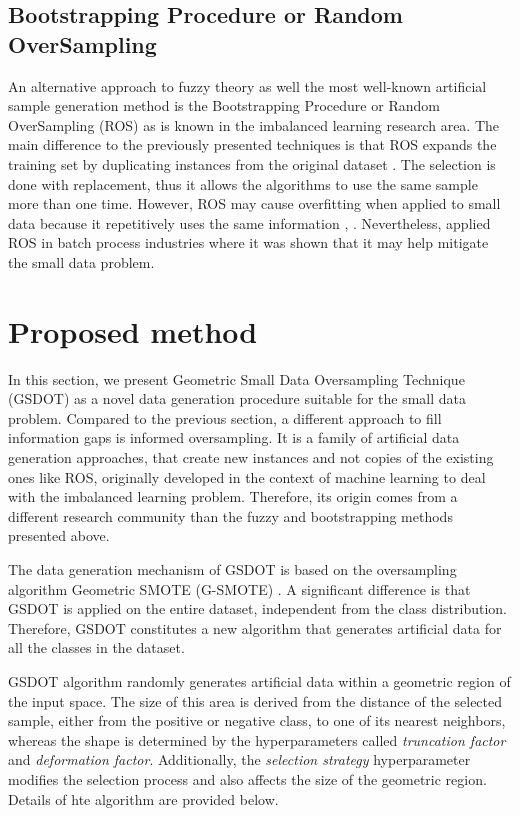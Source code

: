 \subsection{Bootstrapping Procedure or Random OverSampling}

An alternative approach to fuzzy theory as well the most well-known artificial sample generation method is the Bootstrapping Procedure \cite{AbdulLateh.2017} or Random OverSampling (ROS) as is known in the imbalanced learning research area. The main difference to the previously presented techniques is that ROS expands the training set by duplicating instances from the original dataset \cite{Efron.1993}. The selection is done with replacement, thus it allows the algorithms to use the same sample more than one time. However, ROS may cause overfitting when applied to small data because it repetitively uses the same information \cite{Tsai.2015}, \cite{Li.2018}. Nevertheless, \cite{Ivanescu.2006} applied ROS in batch process industries where it was shown that it may help mitigate the small data problem.

\section{Proposed method}
\label{proposed}

In this section, we present Geometric Small Data Oversampling Technique (GSDOT) as a novel data generation procedure suitable for the small data problem. Compared to the previous section, a different approach to fill information gaps is informed oversampling. It is a family of artificial data generation approaches, that create new instances and not copies of the existing ones like ROS, originally developed in the context of machine learning to deal with the imbalanced learning problem. Therefore, its origin comes from a different research community than the fuzzy and bootstrapping methods presented above.

The data generation mechanism of GSDOT is based on the oversampling algorithm Geometric SMOTE (G-SMOTE) \cite{Douzas.2019}. A significant difference is that GSDOT is applied on the entire dataset, independent from the class distribution. Therefore, GSDOT constitutes a new algorithm that generates artificial data for all the classes in the dataset.

GSDOT algorithm randomly generates artificial data within a geometric region of the input space. The size of this area is derived from the distance of the selected sample, either from the positive or negative class, to one of its nearest neighbors, whereas the shape is determined by the hyperparameters called \textit{truncation factor} and \textit{deformation factor}. Additionally, the \textit{selection strategy} hyperparameter modifies the selection process and also affects the size of the geometric region. Details of hte algorithm are provided below.

